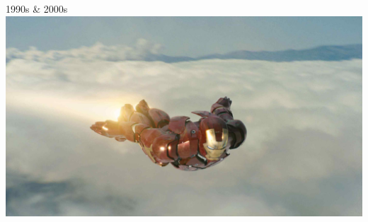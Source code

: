 \documentclass{lug}
\begin{document}
\begin{frame}{1990s \& 2000s}
{        \includegraphics[width=\textwidth]{graphics/iron_man_2008}
    }
\end{frame}
\end{document}
